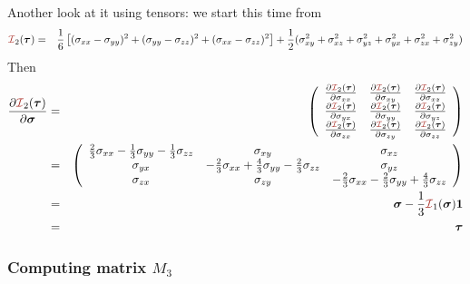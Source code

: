 Another look at it using tensors: we start this time from 
\begin{eqnarray}
{\III}_2({\bm \tau})   
&=&
\frac{1}{6}\left[(\sigma_{xx}-\sigma_{yy})^2 + (\sigma_{yy}-\sigma_{zz})^2 + (\sigma_{xx}-\sigma_{zz})^2 \right]  
+\frac12( \sigma_{xy}^2 + \sigma_{xz}^2 + \sigma_{yz}^2  
+ \sigma_{yx}^2 + \sigma_{zx}^2 + \sigma_{zy}^2) 
\end{eqnarray}
Then
\begin{eqnarray}
\frac{\partial {\III}_2(\bm\tau)}{\partial \bm\sigma}  
&=&
\left(
\begin{array}{ccc}
\frac{\partial {\III}_2(\bm\tau)}{\partial \sigma_{xx}} &   
\frac{\partial {\III}_2(\bm\tau)}{\partial \sigma_{xy}} &   
\frac{\partial {\III}_2(\bm\tau)}{\partial \sigma_{xz}} \\
\frac{\partial {\III}_2(\bm\tau)}{\partial \sigma_{yx}} &   
\frac{\partial {\III}_2(\bm\tau)}{\partial \sigma_{yy}} &   
\frac{\partial {\III}_2(\bm\tau)}{\partial \sigma_{yz}} \\
\frac{\partial {\III}_2(\bm\tau)}{\partial \sigma_{zx}} &   
\frac{\partial {\III}_2(\bm\tau)}{\partial \sigma_{zy}} &   
\frac{\partial {\III}_2(\bm\tau)}{\partial \sigma_{zz}} 
\end{array}
\right) \nonumber\\
&=&
\left(
\begin{array}{ccc}
\frac23 \sigma_{xx} -\frac13\sigma_{yy} -\frac13\sigma_{zz} & \sigma_{xy}& \sigma_{xz} \\
\sigma_{yx}&-\frac23 \sigma_{xx} +\frac43\sigma_{yy} -\frac23\sigma_{zz} & \sigma_{yz}\\
\sigma_{zx}& \sigma_{zy}& -\frac23\sigma_{xx} -\frac23\sigma_{yy} +\frac43\sigma_{zz} 
\end{array}
\right) \nonumber\\
&=&{\bm\sigma} - \frac13 {\III}_1(\bm\sigma)\bm 1 \nonumber\\
&=& \bm \tau \label{eq:dI2dtau}
\end{eqnarray}









\subsubsection{Computing matrix $M_3$}

